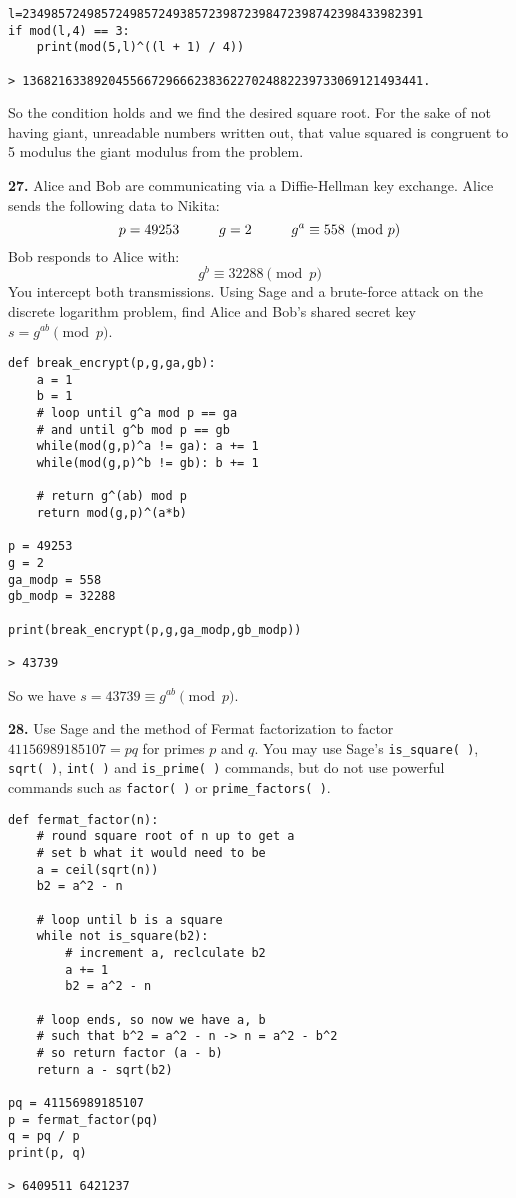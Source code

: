 \documentclass[12pt]{amsart}
\begin{document}
\begin{verbatim}
l=23498572498572498572493857239872398472398742398433982391
if mod(l,4) == 3:
    print(mod(5,l)^((l + 1) / 4))

> 13682163389204556672966623836227024882239733069121493441.
\end{verbatim}

So the condition holds and we find the desired square root. For the sake of not having giant, unreadable numbers written out, that value squared is congruent to 5 modulus the giant modulus from the problem.

\medskip

\newpage

{\bf 27.}  Alice and Bob are communicating via a Diffie-Hellman key exchange.  Alice sends the following data to Nikita:
$$
p=49253 \hskip1cm g=2 \hskip1cm g^a\equiv 558\pmod{p}
$$
Bob responds to Alice with:
$$
g^b\equiv32288\pmod{p}
$$
You intercept both transmissions.  Using Sage and a brute-force attack on the discrete logarithm problem, find Alice and Bob's shared secret key $s=g^{ab}\pmod{p}$.

\begin{verbatim}
def break_encrypt(p,g,ga,gb):
    a = 1
    b = 1
    # loop until g^a mod p == ga
    # and until g^b mod p == gb
    while(mod(g,p)^a != ga): a += 1
    while(mod(g,p)^b != gb): b += 1
        
    # return g^(ab) mod p
    return mod(g,p)^(a*b)
        
p = 49253
g = 2
ga_modp = 558
gb_modp = 32288

print(break_encrypt(p,g,ga_modp,gb_modp))

> 43739
\end{verbatim}

\smallskip

So we have $s = 43739 \equiv g^{ab}\pmod{p}$.

\medskip

\newpage

{\bf 28.}  Use Sage and the method of Fermat factorization to factor $41156989185107=pq$ for primes $p$ and $q$.  You may use Sage's {\tt is\_square( )}, {\tt sqrt( )}, {\tt int( )} and {\tt is\_prime( )} commands, but do not use powerful commands such as {\tt factor( )} or {\tt prime\_factors( )}.  

\begin{verbatim}
def fermat_factor(n):
    # round square root of n up to get a
    # set b what it would need to be
    a = ceil(sqrt(n))
    b2 = a^2 - n
    
    # loop until b is a square
    while not is_square(b2):
        # increment a, reclculate b2
        a += 1
        b2 = a^2 - n
        
    # loop ends, so now we have a, b
    # such that b^2 = a^2 - n -> n = a^2 - b^2
    # so return factor (a - b)
    return a - sqrt(b2)

pq = 41156989185107
p = fermat_factor(pq)
q = pq / p
print(p, q)

> 6409511 6421237
\end{verbatim}
\end{document}
